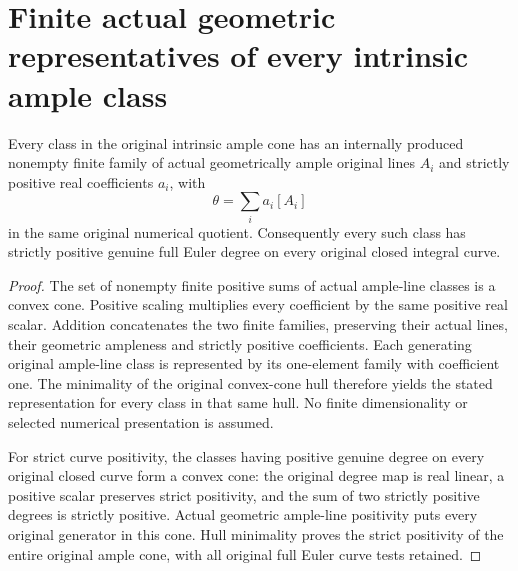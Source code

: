 \section{Finite actual geometric representatives of every intrinsic ample class}
\label{sec:native-numerical-positive-ample-sums}

\begin{theorem}
\label{thm:native-numerical-positive-ample-sums}
\leanok
{}
Every class in the original intrinsic ample cone has an internally
produced nonempty finite family of actual geometrically ample original
lines $A_i$ and strictly positive real coefficients $a_i$, with
\[
 \theta=\sum_i a_i[A_i]
\]
in the same original numerical quotient. Consequently every such class
has strictly positive genuine full Euler degree on every original
closed integral curve.
\end{theorem}
\begin{proof}
The set of nonempty finite positive sums of actual ample-line classes
is a convex cone. Positive scaling multiplies every coefficient by the
same positive real scalar. Addition concatenates the two finite
families, preserving their actual lines, their geometric ampleness and
strictly positive coefficients. Each generating original ample-line
class is represented by its one-element family with coefficient one.
The minimality of the original convex-cone hull therefore yields the
stated representation for every class in that same hull. No finite
dimensionality or selected numerical presentation is assumed.

For strict curve positivity, the classes having positive genuine degree
on every original closed curve form a convex cone: the original degree
map is real linear, a positive scalar preserves strict positivity, and
the sum of two strictly positive degrees is strictly positive. Actual
geometric ample-line positivity puts every original generator in this
cone. Hull minimality proves the strict positivity of the entire
original ample cone, with all original full Euler curve tests retained.
\end{proof}
